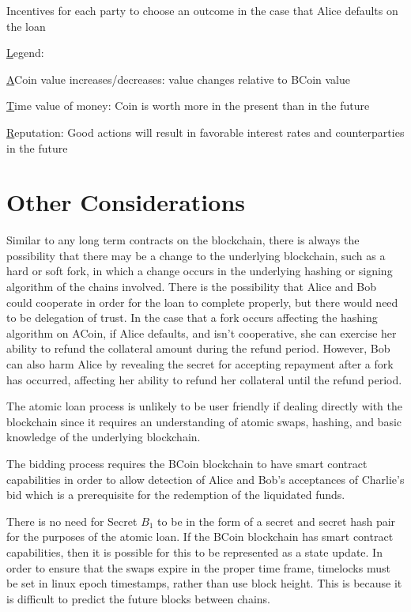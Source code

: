 \documentclass{llncs}
\begin{document}
\begin{center}
Incentives for each party to choose an outcome in the case that Alice defaults on the loan
\end{center}

\noindent
{\ul Legend:}

\noindent
{\ul ACoin value increases/decreases:} value changes relative to BCoin value

\noindent
{\ul Time value of money:} Coin is worth more in the present than in the future

\noindent
{\ul Reputation:} Good actions will result in favorable interest rates and counterparties in the future

\section{Other Considerations}

Similar to any long term contracts on the blockchain, there is always the possibility that there may be a change to the underlying blockchain, such as a hard or soft fork, in which a change occurs in the underlying hashing or signing algorithm of the chains involved. There is the possibility that Alice and Bob could cooperate in order for the loan to complete properly, but there would need to be delegation of trust. In the case that a fork occurs affecting the hashing algorithm on ACoin, if Alice defaults, and isn't cooperative, she can exercise her ability to refund the collateral amount during the refund period. However, Bob can also harm Alice by revealing the secret for accepting repayment after a fork has occurred, affecting her ability to refund her collateral until the refund period. 

The atomic loan process is unlikely to be user friendly if dealing directly with the blockchain since it requires an understanding of atomic swaps, hashing, and basic knowledge of the underlying blockchain. 

The bidding process requires the BCoin blockchain to have smart contract capabilities in order to allow detection of Alice and Bob's acceptances of Charlie's bid which is a prerequisite for the redemption of the liquidated funds.

There is no need for Secret $B_1$ to be in the form of a secret and secret hash pair for the purposes of the atomic loan. If the BCoin blockchain has smart contract capabilities, then it is possible for this to be represented as a state update. 
In order to ensure that the swaps expire in the proper time frame, timelocks must be set in linux epoch timestamps, rather than use block height. This is because it is difficult to predict the future blocks between chains. 
\end{document}
